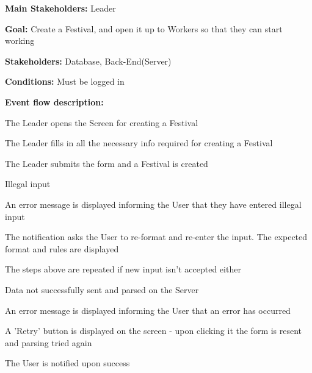 				\noindent {}
				\begin{packed_item}
					\item \textbf{Main Stakeholders:} Leader
					\item \textbf{Goal:} Create a Festival, and open it up to Workers so that they can start working
					\item \textbf{Stakeholders:} Database, Back-End(Server)
					\item \textbf{Conditions:} Must be logged in
					\item \textbf{Event flow description: }
					\begin{packed_enum}
						\item The Leader opens the Screen for creating a Festival
						\item The Leader fills in all the necessary info required for creating a Festival
						\item The Leader submits the form and a Festival is created
					\end{packed_enum}
					
					\begin{packed_item}
						\item[2.a] Illegal input
						\item[] \begin{packed_enum}
							\item An error message is displayed informing the User that they have entered illegal input
							\item The notification asks the User to re-format and re-enter the input. The expected format and rules are displayed
							\item The steps above are repeated if new input isn't accepted either
						\end{packed_enum}
						
						\item[3.a] Data not successfully sent and parsed on the Server
						\item[] \begin{packed_enum}
							\item An error message is displayed informing the User that an error has occurred
							\item A 'Retry' button is displayed on the screen - upon clicking it the form is resent and parsing tried again
							\item The User is notified upon success
						\end{packed_enum}
					
					\end{packed_item}
				\end{packed_item}
					
